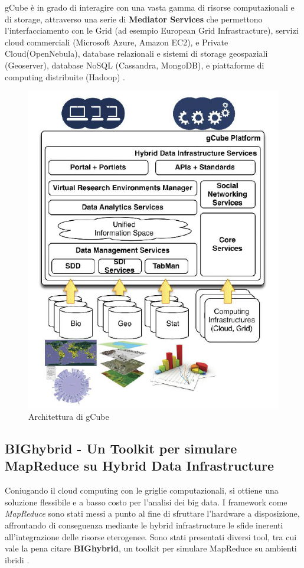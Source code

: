 \documentclass[11pt]{article}
\begin{document}
gCube è in grado di interagire con una vasta gamma di risorse computazionali e di storage, attraverso una serie di\textbf{ Mediator Services} che permettono l'interfacciamento con le Grid (ad esempio European Grid Infrastracture), servizi cloud commerciali (Microsoft Azure, Amazon EC2), e Private Cloud(OpenNebula), database relazionali e sistemi di storage geospaziali (Geoserver), database NoSQL (Cassandra, MongoDB), e piattaforme di computing distribuite (Hadoop) \cite{candela2012managing} \cite{candela2008gcube}.

\begin{figure}[H]
	\centering
	\includegraphics[scale=0.6]{images/gcube.png}
	\caption{Architettura di gCube \cite{candela2012managing}}
	\label{gcube}
\end{figure}

\subsection{BIGhybrid - Un Toolkit per simulare MapReduce su Hybrid Data Infrastructure}
Coniugando il cloud computing con le griglie computazionali, si ottiene una soluzione flessibile e a basso costo per l'analisi dei big data. I framework come \emph{MapReduce} sono stati messi a punto al fine di sfruttare l'hardware a disposizione, affrontando di conseguenza mediante le hybrid infrastructure le sfide inerenti all'integrazione delle risorse eterogenee. Sono stati presentati diversi tool, tra cui vale la pena citare \textbf{BIGhybrid}, un toolkit per simulare MapReduce su ambienti ibridi \cite{6972028}. 
\end{document}
